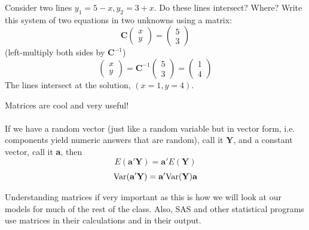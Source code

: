 \begin{enumerate}
Consider two lines $y_1=5-x, y_2=3+x$.  Do these lines intersect?  Where?
Write this system of two equations in two unknowns using a matrix:
$$ \textbf{C} \left(\begin{array}{c} x \\ y\end{array}\right) = \left(\begin{array}{c} 5 \\ 3\end{array}\right)$$
(left-multiply both sides by $\textbf{C}^{-1}$) 
$$ \left(\begin{array}{c} x \\ y\end{array}\right) = \textbf{C}^{-1} \left(\begin{array}{c} 5 \\ 3\end{array}\right) = \left(\begin{array}{c}1 \\ 4 \end{array}\right)$$
The lines intersect at the solution, $(x=1,y=4)$.
\end{enumerate}

Matrices are cool and very useful!\\~\\

If we have a random vector (just like a random variable but in vector form, i.e. components yield numeric answers that are random), call it $\textbf{Y}$, and a constant vector, call it \textbf{a}, then
$$E(\textbf{a}'\textbf{Y}) = \textbf{a}'E(\textbf{Y})$$
$$\mbox{Var}(\textbf{a}'\textbf{Y}) = \textbf{a}'\mbox{Var}(\textbf{Y})\textbf{a}$$

Understanding matrices if very important as this is how we will look at our models for much of the rest of the class.  Also, SAS and other statistical programs use matrices in their calculations and in their output.

\newpage

